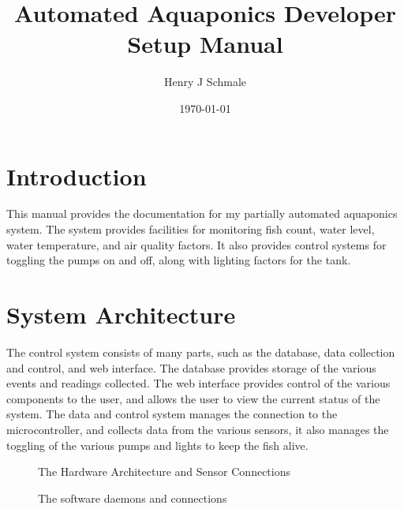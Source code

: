 \documentclass[american,man,12pt]{article}
\title{Automated Aquaponics Developer Setup Manual}
\author{Henry J Schmale}
\affiliation{Harrisburg University of Science and Technology}
\date{\today}
\begin{document}
\maketitle

\section{Introduction}
This manual provides the documentation for my partially automated aquaponics
system. The system provides facilities for monitoring fish count, water level,
water temperature, and air quality factors. It also provides control systems
for toggling the pumps on and off, along with lighting factors for the tank.

\section{System Architecture}
The control system consists of many parts, such as the database, data collection
and control, and web interface. The database provides storage of the various
events and readings collected. The web interface provides control of the various
components to the user, and allows the user to view the current status of the system.
The data and control system manages the connection to the microcontroller, and collects
data from the various sensors, it also manages the toggling of the various pumps and
lights to keep the fish alive.

\begin{figure}[h]
    \centering
    \caption{The Hardware Architecture and Sensor Connections}
    \label{fig:Hardware Architecture}
\end{figure}

\begin{figure}[h]
    \centering
    \caption{The software daemons and connections}
    \label{fig:Software Architecture}
\end{figure}
\end{document}
